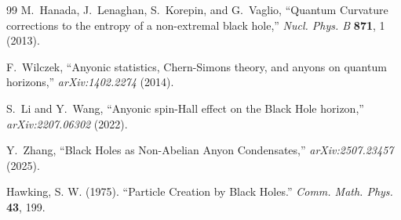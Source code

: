 \documentclass[11pt,a4paper]{article}
\begin{document}
\begin{thebibliography}{99}
M.~Hanada, J.~Lenaghan, S.~Korepin, and G.~Vaglio,
``Quantum Curvature corrections to the entropy of a non-extremal black hole,''
\textit{Nucl. Phys. B} \textbf{871}, 1 (2013).

F.~Wilczek,
``Anyonic statistics, Chern-Simons theory, and anyons on quantum horizons,''
\textit{arXiv:1402.2274} (2014).

S.~Li and Y.~Wang,
``Anyonic spin-Hall effect on the Black Hole horizon,''
\textit{arXiv:2207.06302} (2022).

Y.~Zhang,
``Black Holes as Non-Abelian Anyon Condensates,''
\textit{arXiv:2507.23457} (2025).

Hawking, S. W. (1975).
``Particle Creation by Black Holes.''
\textit{Comm. Math. Phys.} \textbf{43}, 199.

\end{thebibliography}
\end{document}
